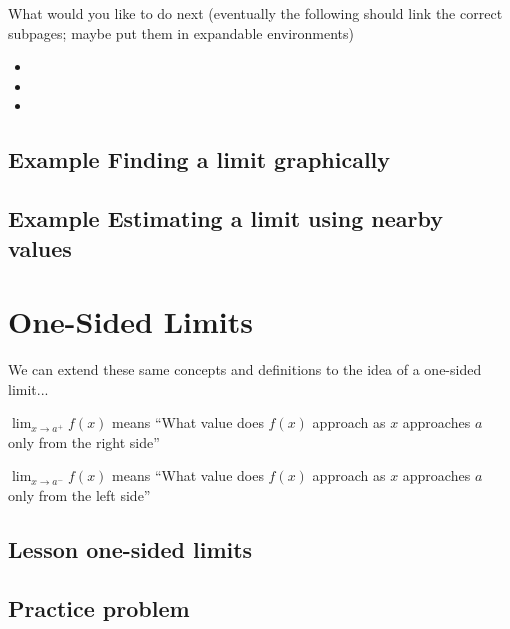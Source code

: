 \documentclass{ximera}
\begin{document}
What would you like to do next
(eventually the following should link the correct subpages; maybe put them in expandable environments)
\begin{itemize}
    \item {} 
    \item {}
    \item {}
\end{itemize}

\subsection{Example Finding a limit graphically}
\begin{center}
\end{center}

\subsection{Example Estimating a limit using nearby values}
\begin{center}
\end{center}

\section{One-Sided Limits}

We can extend these same concepts and definitions to the idea of a one-sided limit...

$\lim_{x \to a^+} f(x)$ means ``What value does $f(x)$ approach as $x$ approaches $a$ only from the right side''

$\lim_{x \to a^-} f(x)$ means ``What value does $f(x)$ approach as $x$ approaches $a$ only from the left side''

\subsection{Lesson one-sided limits}

\begin{center}
\end{center}

\subsection{Practice problem}
\end{document}
